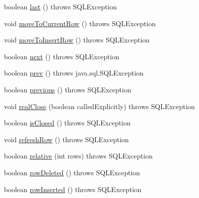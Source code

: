 \begin{DoxyCompactItemize}
\item 
boolean \mbox{\hyperlink{classcom_1_1mysql_1_1cj_1_1jdbc_1_1result_1_1_result_set_impl_a726607ce43d6c57d8a990f244c2110f9}{last}} ()  throws S\+Q\+L\+Exception 
\item 
void \mbox{\hyperlink{classcom_1_1mysql_1_1cj_1_1jdbc_1_1result_1_1_result_set_impl_a7af90003540854b7621cd56d0589bc1c}{move\+To\+Current\+Row}} ()  throws S\+Q\+L\+Exception 
\item 
void \mbox{\hyperlink{classcom_1_1mysql_1_1cj_1_1jdbc_1_1result_1_1_result_set_impl_a6cb04d70ac9625266ee7709ea06f380a}{move\+To\+Insert\+Row}} ()  throws S\+Q\+L\+Exception 
\item 
boolean \mbox{\hyperlink{classcom_1_1mysql_1_1cj_1_1jdbc_1_1result_1_1_result_set_impl_a4f0a3d623b2e066d6bd3324bdeaac087}{next}} ()  throws S\+Q\+L\+Exception 
\item 
boolean \mbox{\hyperlink{classcom_1_1mysql_1_1cj_1_1jdbc_1_1result_1_1_result_set_impl_a8ee52e92f7e5e671bf694f728936171e}{prev}} ()  throws java.\+sql.\+S\+Q\+L\+Exception 
\item 
boolean \mbox{\hyperlink{classcom_1_1mysql_1_1cj_1_1jdbc_1_1result_1_1_result_set_impl_a01b45fa8c2b4afe82d82955c8d846992}{previous}} ()  throws S\+Q\+L\+Exception 
\item 
void \mbox{\hyperlink{classcom_1_1mysql_1_1cj_1_1jdbc_1_1result_1_1_result_set_impl_a33dfcef00d2e567cee58610ade647321}{real\+Close}} (boolean called\+Explicitly)  throws S\+Q\+L\+Exception 
\item 
boolean \mbox{\hyperlink{classcom_1_1mysql_1_1cj_1_1jdbc_1_1result_1_1_result_set_impl_a348d7112c64ce23460634afa8e0fa748}{is\+Closed}} ()  throws S\+Q\+L\+Exception 
\item 
void \mbox{\hyperlink{classcom_1_1mysql_1_1cj_1_1jdbc_1_1result_1_1_result_set_impl_aabf0910c2996fcdb2f385bcba4811de1}{refresh\+Row}} ()  throws S\+Q\+L\+Exception 
\item 
boolean \mbox{\hyperlink{classcom_1_1mysql_1_1cj_1_1jdbc_1_1result_1_1_result_set_impl_a0e8802f09b0fd17669cb46ba6c3c3457}{relative}} (int rows)  throws S\+Q\+L\+Exception 
\item 
boolean \mbox{\hyperlink{classcom_1_1mysql_1_1cj_1_1jdbc_1_1result_1_1_result_set_impl_a19fe8a7a599a6d4152e56448c8f10c62}{row\+Deleted}} ()  throws S\+Q\+L\+Exception 
\item 
boolean \mbox{\hyperlink{classcom_1_1mysql_1_1cj_1_1jdbc_1_1result_1_1_result_set_impl_abc8b8d728914c02e4cb318bb22337b86}{row\+Inserted}} ()  throws S\+Q\+L\+Exception 

\end{DoxyCompactItemize}
